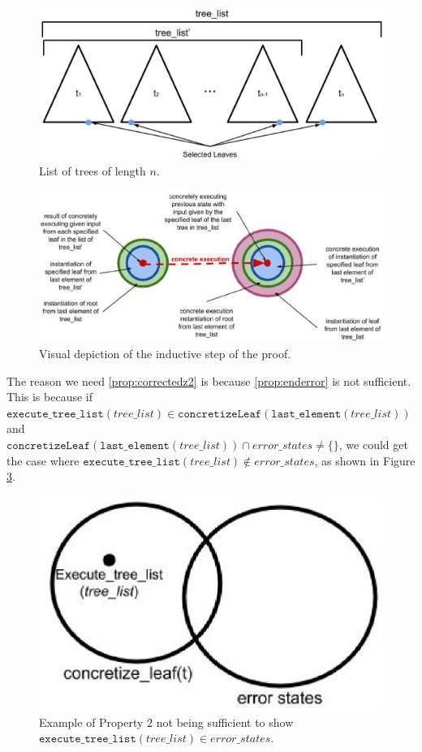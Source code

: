\begin{figure}
\centering
\includegraphics[width=.8\textwidth]{tlist.eps}
\caption{List of trees of length $n$.}
\label{fig:tlist}
\end{figure}

\begin{figure}
\centering
\includegraphics[width=.8\textwidth]{set4.eps}
\caption{Visual depiction of the inductive step of the proof.}
\label{fig:indstep}
\end{figure}




The reason we need \ref{prop:correctedz2} is because \ref{prop:enderror} is not sufficient. 
This is because if $\mathtt{execute\_tree\_list} (tree\_list) \in \mathtt{concretizeLeaf} (\mathtt{last\_element}(tree\_list))$ and \\
$\mathtt{concretizeLeaf} (\mathtt{last\_element} (tree\_list)) \cap error\_states \neq \{\}$, we could get the case where
$\mathtt{execute\_tree\_list} (tree\_list) \notin error\_states$, as shown in Figure \ref{fig:Prop2}.

\begin{figure}
  \centering
\includegraphics[width=.4\textwidth]{prop2.eps}
\caption{Example of Property $2$ not being sufficient to show $\mathtt{execute\_tree\_list} (tree\_list) \in error\_states$.}
\label{fig:Prop2}
\end{figure}
